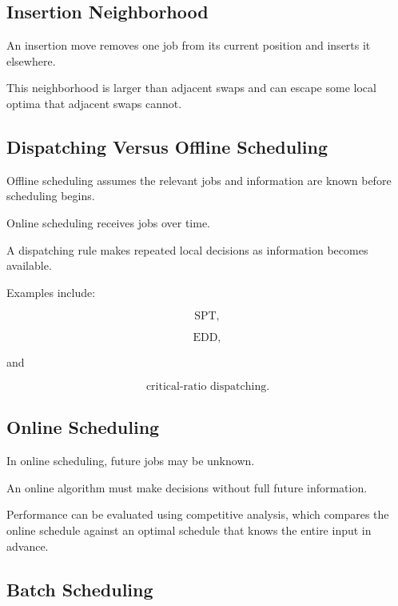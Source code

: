 \subsection{Insertion Neighborhood}
\label{subsec:insertion-neighborhood}

An insertion move removes one job from its current position and inserts it
elsewhere.

This neighborhood is larger than adjacent swaps and can escape some local
optima that adjacent swaps cannot.

\subsection{Dispatching Versus Offline Scheduling}
\label{subsec:dispatching-versus-offline}

Offline scheduling assumes the relevant jobs and information are known
before scheduling begins.

Online scheduling receives jobs over time.

A dispatching rule makes repeated local decisions as information becomes
available.

Examples include:

\[
\boxed{
\text{SPT},
}
\]

\[
\boxed{
\text{EDD},
}
\]

and

\[
\boxed{
\text{critical-ratio dispatching}.
}
\]

\subsection{Online Scheduling}
\label{subsec:online-scheduling}

In online scheduling, future jobs may be unknown.

An online algorithm must make decisions without full future information.

Performance can be evaluated using competitive analysis, which compares
the online schedule against an optimal schedule that knows the entire
input in advance.

\subsection{Batch Scheduling}
\label{subsec:batch-scheduling}

